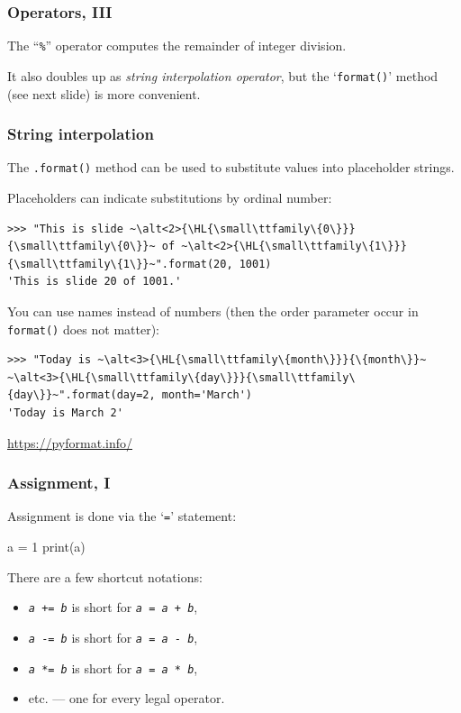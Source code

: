 \documentclass[english,serif,mathserif,xcolor=pdftex,dvipsnames,table]{beamer}
\begin{document}
\begin{frame}[fragile]
  \frametitle{Operators, III}
  The ``\texttt{\%}'' operator computes the remainder of integer division.
\begin{semiverbatim}
\end{semiverbatim}

  \+ It also doubles up as \emph{string interpolation operator}, but the
  `\lstinline|format()|' method (see next slide) is more convenient.
\end{frame}


\begin{frame}[fragile]
  \frametitle{String interpolation}
  The \lstinline|.format()| method can be used to substitute values into placeholder
  strings.

  \+ \pause
  Placeholders can indicate substitutions by ordinal number:
\begin{lstlisting}[basicstyle=\footnotesize\ttfamily]
>>> "This is slide ~\alt<2>{\HL{\small\ttfamily\{0\}}}{\small\ttfamily\{0\}}~ of ~\alt<2>{\HL{\small\ttfamily\{1\}}}{\small\ttfamily\{1\}}~".format(20, 1001)
'This is slide 20 of 1001.'
\end{lstlisting}

  \+ \pause
  You can use names instead of numbers (then the order parameter occur in
  \lstinline|format()| does not matter):
\begin{lstlisting}[basicstyle=\footnotesize\ttfamily]
>>> "Today is ~\alt<3>{\HL{\small\ttfamily\{month\}}}{\{month\}}~ ~\alt<3>{\HL{\small\ttfamily\{day\}}}{\small\ttfamily\{day\}}~".format(day=2, month='March')
'Today is March 2'
\end{lstlisting}

  \begin{references}
    \url{https://pyformat.info/}
  \end{references}
\end{frame}


\begin{frame}[fragile]
  \frametitle{Assignment, I}
  Assignment is done via the `\texttt{=}' statement:
\begin{semiverbatim}
\In a = 1
\In print(a)
\end{semiverbatim}

  \+
  There are a few shortcut notations:
  \begin{itemize}
  \item[] \texttt{\emph{a} += \emph{b}} is short for \texttt{\emph{a} = \emph{a} + \emph{b}},
  \item[] \texttt{\emph{a} -= \emph{b}} is short for \texttt{\emph{a} = \emph{a} - \emph{b}},
  \item[] \texttt{\emph{a} *= \emph{b}} is short for \texttt{\emph{a} = \emph{a} * \emph{b}},
  \item[]   etc. --- one for every legal operator.
  \end{itemize}
\end{frame}
\end{document}
